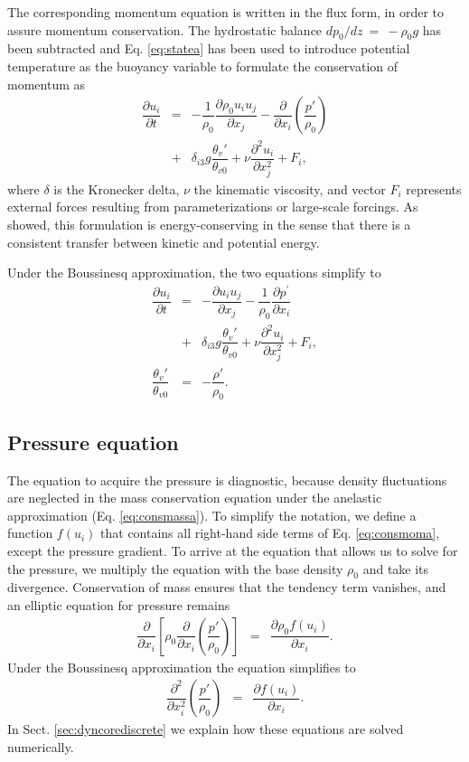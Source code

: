 \documentclass[gmd,manuscript]{copernicus}
\begin{document}
The corresponding momentum equation is written in the flux form, in order to assure momentum conservation. The hydrostatic balance $dp_0 / dz~=~-\rho_0 g$ has been subtracted and Eq. \ref{eq:statea} has been used to introduce potential temperature as the buoyancy variable to formulate the conservation of momentum as
\begin{eqnarray}
\nonumber \dfrac{\partial u_i}{\partial t} & = & - \dfrac{1}{\rho_0} \dfrac{\partial \rho_0 u_i u_j}{\partial x_j} 
- \dfrac{\partial}{\partial x_i}\left(\dfrac{p'}{\rho_0}\right) \\
& + & \delta_{i3} g \dfrac{\theta_v'}{\theta_{v0}} + \nu \dfrac{\partial^2 u_i}{\partial x_j^2} + F_i,\label{eq:consmoma}
\end{eqnarray}
where $\delta$ is the Kronecker delta, $\nu$ the kinematic viscosity, and vector $F_i$ represents external forces resulting from parameterizations or large-scale forcings. As \citet{Bannon1996} showed, this formulation is energy-conserving in the sense that there is a consistent transfer between kinetic and potential energy.

Under the Boussinesq approximation, the two equations simplify to
\begin{eqnarray}
\nonumber \dfrac{\partial u_i}{\partial t} & = & - \dfrac{\partial u_i u_j}{\partial x_j} - \dfrac{1}{\rho_0}\dfrac{\partial p^\prime}{\partial x_i} \\
& + & \delta_{i3} g \dfrac{\theta_v'}{\theta_{v0}} + \nu \dfrac{\partial^2 u_i}{\partial x_j^2} + F_i \label{eq:consmomb},\\
\dfrac{\theta_v'}{\theta_{v0}} & = & - \dfrac{\rho'}{\rho_0}\label{eq:stateb}.
\end{eqnarray}

\subsection{Pressure equation}
The equation to acquire the pressure is diagnostic, because density fluctuations are neglected in the mass conservation equation under the anelastic approximation (Eq. \ref{eq:consmassa}). To simplify the notation, we define a function $f \left( u_i \right)$ that contains all right-hand side terms of Eq. \ref{eq:consmoma}, except the pressure gradient. To arrive at the equation that allows us to solve for the pressure, we multiply the equation with the base density $\rho_0$ and take its divergence. Conservation of mass ensures that the tendency term vanishes, and an elliptic equation for pressure remains
\begin{eqnarray}
\dfrac{\partial}{\partial x_i} 
\left[ \rho_0 \dfrac{\partial}{\partial x_i} \left( \dfrac{p'}{\rho_0} \right) \right] & = &
\dfrac{\partial \rho_0 f \left( u_i \right)}{\partial x_i}.\label{eq:presa}
\end{eqnarray}
Under the Boussinesq approximation the equation simplifies to
\begin{eqnarray}
\dfrac{\partial^2}{\partial x_i^2} \left( \dfrac{p'}{\rho_0} \right) & = &
\dfrac{\partial f \left( u_i \right)}{\partial x_i}.\label{eq:presb}
\end{eqnarray}
In Sect. \ref{sec:dyncorediscrete} we explain how these equations are solved numerically.
\end{document}

